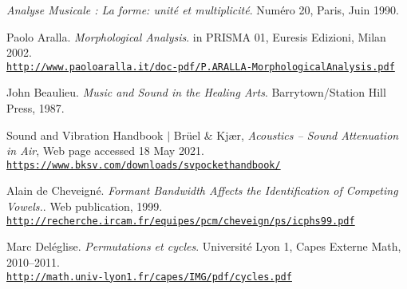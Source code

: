 \renewcommand{\bibname}{References
}

\renewcommand\bibpreamble{$\rightarrow$ The references to go further or deeper for advanced readers are prepended by an asterisk.}

\begin{thebibliography}{99}
\thispagestyle{empty}
		
	\textit{Analyse Musicale : La forme: unité et multiplicité}. Numéro 20, Paris, Juin 1990.
	
	Paolo Aralla. \textit{Morphological Analysis}. in PRISMA 01, Euresis Edizioni, Milan 2002.\\ 
	\href{http://www.paoloaralla.it/doc-pdf/P.ARALLA-MorphologicalAnalysis.pdf}{\scriptsize{\texttt{http://www.paoloaralla.it/doc-pdf/P.ARALLA-MorphologicalAnalysis.pdf}}} \normalsize{}
	
	John Beaulieu. \textit{Music and Sound in the Healing Arts}. Barrytown/Station Hill Press, 1987.
	
	Sound and Vibration Handbook $|$ Br\"uel \& Kj\ae r, \textit{Acoustics -- Sound Attenuation in Air}, Web page accessed 18 May 2021.\\ 
	\href{https://www.bksv.com/downloads/svpockethandbook/}{\scriptsize{\texttt{https://www.bksv.com/downloads/svpockethandbook/}}} \normalsize{}
		
	Alain de Cheveign\'{e}. \textit{Formant Bandwidth Affects the Identification of Competing Vowels.}. Web publication, 1999.\\ \href{http://recherche.ircam.fr/equipes/pcm/cheveign/ps/icphs99.pdf}{\scriptsize{\texttt{http://recherche.ircam.fr/equipes/pcm/cheveign/ps/icphs99.pdf}}} \normalsize{}

		
	Marc Del\'{e}glise. \textit{Permutations et cycles}. Universit\'{e} Lyon 1, Capes Externe Math, 2010--2011.\\ \href{http://math.univ-lyon1.fr/capes/IMG/pdf/cycles.pdf}{\scriptsize{\texttt{http://math.univ-lyon1.fr/capes/IMG/pdf/cycles.pdf}}} \normalsize{}
	

\end{thebibliography}
